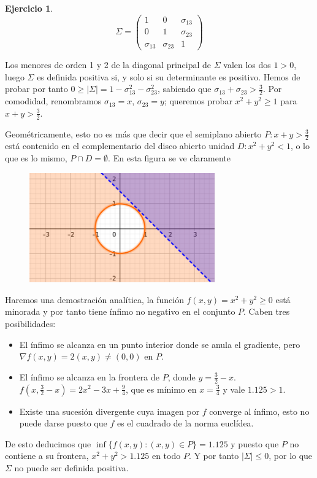 \documentclass[12pt,spanish]{article}
\theoremstyle{definition}
\newtheorem{exercise}{Ejercicio}
\begin{document}
\setcounter{exercise}{4}
\begin{exercise} %
  \[\Sigma=
    \begin{pmatrix}
      1 & 0 & \sigma_{13} \\
      0 & 1 & \sigma_{23} \\
      \sigma_{13} & \sigma_{23} & 1
    \end{pmatrix}
  \]

  Los menores de orden 1 y 2 de la diagonal principal de $\Sigma$
  valen los dos $1>0$, luego $\Sigma$ es definida positiva si, y solo
  si su determinante es positivo. Hemos de probar por tanto
  $0\geq|\Sigma|=1-\sigma_{13}^2-\sigma_{23}^2$, sabiendo que
  $\sigma_{13}+\sigma_{23}>\frac{3}{2}$. Por comodidad, renombramos
  $\sigma_{13}=x$, $\sigma_{23}=y$; queremos probar $x^2+y^2\geq 1$
  para $x+y>\frac{3}{2}$.

  Geométricamente, esto no es más que decir que el semiplano abierto
  $P:x+y>\frac{3}{2}$ está contenido en el complementario del disco
  abierto unidad $D:x^2+y^2 < 1$, o lo que es lo mismo,
  $P\cap D=\emptyset$. En esta figura se ve claramente
  \begin{figure}[H]
    \centering
    \includegraphics[width=80mm]{ej1-5.png}
  \end{figure}

  Haremos una demostración analítica, la función
  $f(x,y)=x^2+y^2\geq 0$ está minorada y por tanto tiene ínfimo no
  negativo en el conjunto $P$. Caben tres posibilidades:
  \begin{itemize}
  \item El ínfimo se alcanza en un punto interior donde se anula el
    gradiente, pero $\nabla f(x,y)=2(x,y)\neq(0,0)$ en $P$.
  \item El ínfimo se alcanza en la frontera de $P$, donde
    $y=\frac{3}{2}-x$. $f(x,\frac{3}{2}-x)=2x^2-3x+\frac{9}{4}$, que
    es mínimo en $x=\frac{3}{4}$ y vale $1.125>1$.
  \item Existe una sucesión divergente cuya imagen por $f$ converge al
    ínfimo, esto no puede darse puesto que $f$ es el cuadrado de la
    norma euclídea.
  \end{itemize}

  De esto deducimos que $\inf\{f(x,y) : (x,y)\in P\}=1.125$ y puesto
  que $P$ no contiene a su frontera, $x^2+y^2>1.125$ en todo $P$. Y
  por tanto $|\Sigma|\leq 0$, por lo que $\Sigma$ no puede ser
  definida positiva.
\end{exercise}
\end{document}
